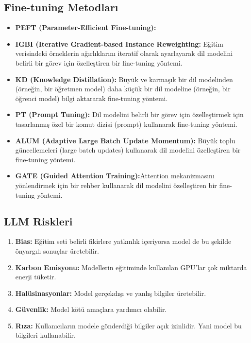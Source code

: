 \subsection{Fine-tuning Metodları}
\begin{itemize}
    \item \textbf{PEFT (Parameter-Efficient Fine-tuning):}
    \item \textbf{IGBI (Iterative Gradient-based Instance Reweighting:} Eğitim verisindeki örneklerin ağırlıklarını iteratif olarak ayarlayarak dil modelini belirli bir görev için özelleştiren bir fine-tuning yöntemi.
    \item \textbf{KD (Knowledge Distillation):} Büyük ve karmaşık bir dil modelinden (örneğin, bir öğretmen model) daha küçük bir dil modeline (örneğin, bir öğrenci model) bilgi aktararak fine-tuning yöntemi.
    \item \textbf{PT (Prompt Tuning):} Dil modelini belirli bir görev için özelleştirmek için tasarlanmış özel bir komut dizisi (prompt) kullanarak fine-tuning yöntemi.
    \item \textbf{ALUM (Adaptive Large Batch Update Momentum):} Büyük toplu güncellemeleri (large batch updates) kullanarak dil modelini özelleştiren bir fine-tuning yöntemi.
    \item \textbf{GATE (Guided Attention Training):}Attention mekanizmasını yönlendirmek için bir rehber kullanarak dil modelini özelleştiren bir fine-tuning yöntemi.
\end{itemize}

\subsection{LLM Riskleri}
\begin{enumerate}
    \item \textbf{Bias:} Eğitim seti belirli fikirlere yatkınlık içeriyorsa model de bu şekilde önyargılı sonuçlar üretebilir.
    \item \textbf{Karbon Emisyonu:} Modellerin eğitiminde kullanılan GPU'lar çok miktarda enerji tüketir.
    \item \textbf{Halüsinasyonlar:} Model gerçekdışı ve yanlış bilgiler üretebilir.
    \item \textbf{Güvenlik:} Model kötü amaçlara yardımcı olabilir.
    \item \textbf{Rıza:} Kullanıcıların modele gönderdiği bilgiler açık izinlidir. Yani model bu bilgileri kullanabilir.
\end{enumerate}

\newpage